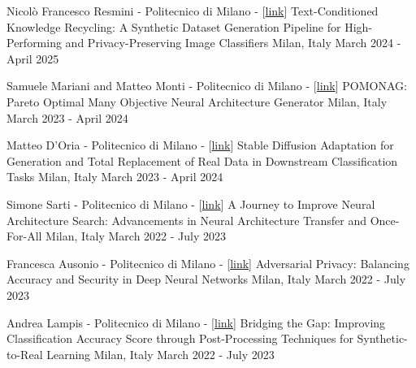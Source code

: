 \begin{cventries}
    \vspace{-10pt}
    \cventry
    {Nicolò Francesco Resmini - Politecnico di Milano - [\href{https://www.politesi.polimi.it/handle/10589/234657}{link}]} %
    {Text-Conditioned Knowledge Recycling: A Synthetic Dataset Generation Pipeline for High-Performing and Privacy-Preserving Image Classifiers} %
    {Milan, Italy} %
    {March 2024 - April 2025} %
    {}

    \vspace{-10pt}
    \cventry
    {Samuele Mariani and Matteo Monti - Politecnico di Milano - [\href{https://www.politesi.polimi.it/handle/10589/218505}{link}]} %
    {POMONAG: Pareto Optimal Many Objective Neural Architecture Generator} %
    {Milan, Italy} %
    {March 2023 - April 2024} %
    {}

    \vspace{-10pt}
    \cventry
    {Matteo D'Oria - Politecnico di Milano - [\href{https://www.politesi.polimi.it/handle/10589/218608}{link}]} %
    {Stable Diffusion Adaptation for Generation and Total Replacement of Real Data in Downstream Classification Tasks} %
    {Milan, Italy} %
    {March 2023 - April 2024} %
    {}

    \vspace{-10pt}
    \cventry
    {Simone Sarti - Politecnico di Milano - [\href{https://www.politesi.polimi.it/handle/10589/203273}{link}]} %
    {A Journey to Improve Neural Architecture Search: Advancements in Neural Architecture Transfer and Once-For-All} %
    {Milan, Italy} %
    {March 2022 - July 2023} %
    {}

    \vspace{-10pt}
    \cventry
    {Francesca Ausonio - Politecnico di Milano - [\href{https://www.politesi.polimi.it/handle/10589/208948}{link}]} %
    {Adversarial Privacy: Balancing Accuracy and Security in Deep Neural Networks} %
    {Milan, Italy} %
    {March 2022 - July 2023} %
    {}

    \vspace{-10pt}
    \cventry
    {Andrea Lampis - Politecnico di Milano - [\href{https://www.politesi.polimi.it/handle/10589/209359}{link}]} %
    {Bridging the Gap: Improving Classification Accuracy Score through Post-Processing Techniques for Synthetic-to-Real Learning} %
    {Milan, Italy} %
    {March 2022 - July 2023} %
    {}
    

\end{cventries}
